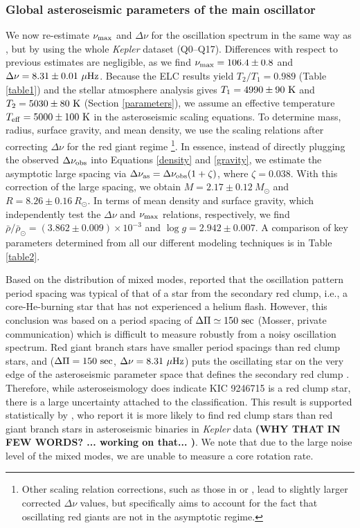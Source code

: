 \subsubsection{Global asteroseismic parameters of the main oscillator}
\label{subsubsec_main_osc}
We now re-estimate $\nu_{\rm{max}}$ and $\Delta \nu$ for the oscillation spectrum in the same way as \citet{gau14}, but by using the whole \textit{Kepler} dataset (Q0--Q17). Differences with respect to previous estimates are negligible, as we find $\nu_{\rm{max}} = 106.4 \pm 0.8$ and $\Delta \nu = 8.31 \pm 0.01 \ \mu \rm{Hz}$. Because the ELC results yield $T_2/T_1=0.989$ (Table \ref{table1}) and the stellar atmosphere analysis gives $T_1 = 4990 \pm 90 \ \rm{K}$ and $T_2 = 5030 \pm 80 \ \rm{K}$ (Section \ref{parameters}), we assume an effective temperature $T_{\rm{eff}} = 5000 \pm 100 \ \rm{K}$ in the asteroseismic scaling equations. To determine mass, radius, surface gravity, and mean density, we use the scaling relations after correcting $\Delta \nu$ for the red giant regime \citep{mos13}\footnote{Other scaling relation corrections, such as those in \citet{cha11} or \citet{kal10}, lead to slightly larger corrected $\Delta \nu$ values, but \citet{mos13} specifically aims to account for the fact that oscillating red giants are not in the asymptotic regime.}. In essence, instead of directly plugging the observed $\Delta \nu_{\rm{obs}}$ into Equations \ref{density} and \ref{gravity}, we estimate the asymptotic large spacing via $\Delta \nu_{\rm{as}} = \Delta \nu_{\rm{obs}} (1 + \zeta)$, where $\zeta = 0.038$. With this correction of the large spacing, we obtain $M = 2.17 \pm 0.12 \ M_{\odot}$ and $R = 8.26 \pm 0.16 \ R_{\odot}$. In terms of mean density and surface gravity, which independently test the $\Delta \nu$  and $\nu_{\rm{max}}$ relations, respectively, we find $\bar{\rho}/\bar{\rho}_{\odot} = (3.862 \pm 0.009) \times 10 ^{-3}$ and $\log g = 2.942 \pm 0.007$. A comparison of key parameters determined from all our different modeling techniques is in Table \ref{table2}.

Based on the distribution of mixed modes, \citet{gau14} reported that the oscillation pattern period spacing was typical of that of a star from the secondary red clump, i.e., a core-He-burning star that has not experienced a helium flash. However, this conclusion was based on a period spacing of $\Delta \Pi \simeq 150 \ \rm{sec}$ (Mosser, private communication) which is difficult to measure robustly from a noisy oscillation spectrum. Red giant branch stars have smaller period spacings than red clump stars, and ($\Delta \Pi = 150 \ \rm{sec}$, $\Delta \nu = 8.31 \ \mu \rm{Hz}$) puts the oscillating star on the very edge of the asteroseismic parameter space that defines the secondary red clump \citep{mos14}. Therefore, while asteroseismology does indicate KIC 9246715 is a red clump star, there is a large uncertainty attached to the classification. This result is supported statistically by \citet{mig14}, who report it is more likely to find red clump stars than red giant branch stars in asteroseismic binaries in \emph{Kepler} data {\textbf{(WHY THAT IN FEW WORDS? ... working on that... )}}. We note that due to the large noise level of the mixed modes, we are unable to measure a core rotation rate.

